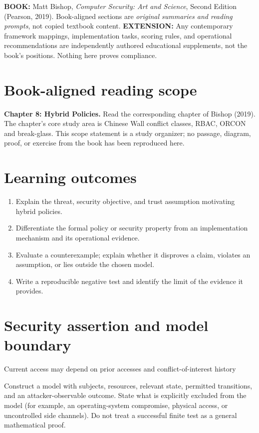 \documentclass[10pt,letterpaper]{article}
\begin{document}
\makedoctocpage
\begin{notebox}
\textbf{BOOK:} Matt Bishop, \emph{Computer Security: Art and Science}, Second Edition (Pearson, 2019). Book-aligned sections are \emph{original summaries and reading prompts}, not copied textbook content.
\textbf{EXTENSION:} Any contemporary framework mappings, implementation tasks, scoring rules, and operational recommendations are independently authored educational supplements, not the book's positions. Nothing here proves compliance.
\end{notebox}
\section{Book-aligned reading scope}
\textbf{Chapter 8: Hybrid Policies.} Read the corresponding chapter of Bishop (2019). The chapter's core study area is Chinese Wall conflict classes, RBAC, ORCON and break-glass. This scope statement is a study organizer; no passage, diagram, proof, or exercise from the book has been reproduced here.
\section{Learning outcomes}
\begin{enumerate}
\item Explain the threat, security objective, and trust assumption motivating hybrid policies.
\item Differentiate the formal policy or security property from an implementation mechanism and its operational evidence.
\item Evaluate a counterexample; explain whether it disproves a claim, violates an assumption, or lies outside the chosen model.
\item Write a reproducible negative test and identify the limit of the evidence it provides.
\end{enumerate}
\section{Security assertion and model boundary}
\begin{infobox}
Current access may depend on prior accesses and conflict-of-interest history
\end{infobox}
Construct a model with subjects, resources, relevant state, permitted transitions, and an attacker-observable outcome. State what is explicitly excluded from the model (for example, an operating-system compromise, physical access, or uncontrolled side channels). Do not treat a successful finite test as a general mathematical proof.
\end{document}
